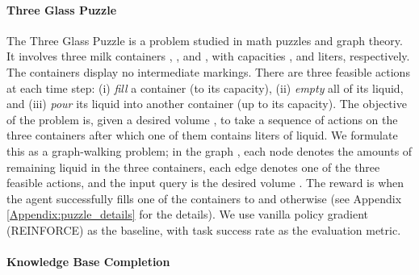 \documentclass{article}
\begin{document}
\paragraph{Three Glass Puzzle} The Three Glass Puzzle \cite{ore1990graphs} is a problem studied in math puzzles and graph theory. It involves three milk containers , , and , with capacities ,  and  liters, respectively. The containers display no intermediate markings. There are three feasible actions at each time step: (i) \emph{fill} a container (to its capacity),  (ii) \emph{empty} all of its liquid, and (iii) \emph{pour} its liquid into another container (up to its capacity). The objective of the problem is, given a desired volume , to take a sequence of actions on the three containers after which one of them contains  liters of liquid. We formulate this as a graph-walking problem; in the graph , each node  denotes the amounts of remaining liquid in the three containers, each edge denotes one of the three feasible actions, and the input query is the desired volume . The reward is  when the agent successfully fills one of the containers to  and  otherwise (see Appendix \ref{Appendix:puzzle_details} for the details).
	We use vanilla policy gradient (REINFORCE) \cite{williams1992simple} as the baseline, with task success rate as the evaluation metric.
	
\paragraph{Knowledge Base Completion}
    
\end{document}
